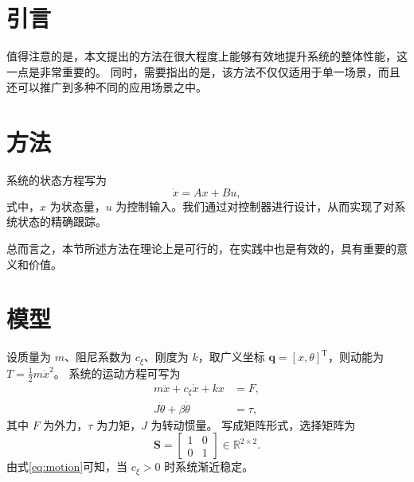 \section{引言}

值得注意的是，本文提出的方法在很大程度上能够有效地提升系统的整体性能，这一点是非常重要的。
同时，需要指出的是，该方法不仅仅适用于单一场景，而且还可以推广到多种不同的应用场景之中。

\section{方法}

系统的状态方程写为
\begin{equation}
  \dot{x} = A x + B u ,
\end{equation}
式中，$x$ 为状态量，$u$ 为控制输入。我们通过对控制器进行设计，从而实现了对系统状态的精确跟踪。

总而言之，本节所述方法在理论上是可行的，在实践中也是有效的，具有重要的意义和价值。

\section{模型}

设质量为 $m$、阻尼系数为 $c_\xi$、刚度为 $k$，取广义坐标 $\bm q=[x,\theta]^{\mathrm T}$，则动能为 $T=\frac{1}{2}m\dot x^2$。
系统的运动方程可写为
\begin{align}
  m\ddot x + c_\xi\dot x + k x &= F , \label{eq:motion} \\
  J\ddot\theta + \beta\dot\theta &= \tau ,
\end{align}
其中 $F$ 为外力，$\tau$ 为力矩，$J$ 为转动惯量。
写成矩阵形式，选择矩阵为
\begin{equation}
  \bm S = \begin{bmatrix} 1 & 0 \\ 0 & 1 \end{bmatrix} \in \mathbb R^{2\times 2} .
\end{equation}
由式\eqref{eq:motion}可知，当 $c_\xi>0$ 时系统渐近稳定。
